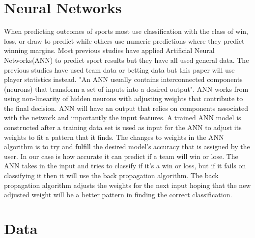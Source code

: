 \documentclass[12pt]{IEEEtran}
\begin{document}
\section{Neural Networks}
When predicting outcomes of sports most use classification with the class of win, loss, or draw to predict while others use numeric predictions where they predict winning margins\cite{bunker2019machine}. Most previous studies have applied Artificial Neural Networks(ANN) to predict sport results but they have all used general data. The previous studies have used team data or betting data but this paper will use player statistics instead. "An ANN usually contains interconnected components (neurons) that transform a set of inputs into a desired output"\cite{bunker2019machine}. ANN works from using non-linearity of hidden neurons with adjusting weights that contribute to the final decision. ANN will have an output that relies on components associated with the network and importantly the input features. A trained ANN model is constructed after a training data set is used as input for the ANN to adjust its weights to fit a pattern that it finds. The changes to weights in the ANN algorithm is to try and fulfill the desired model's accuracy that is assigned by the user. In our case is how accurate it can predict if a team will win or lose. The ANN takes in the input and tries to classify if it's a win or loss, but if it fails on classifying it then it will use the back propagation algorithm. The back propagation algorithm adjusts the weights for the next input hoping that the new adjusted weight will be a better pattern in finding the correct classification. 

\section{Data}
\end{document}
